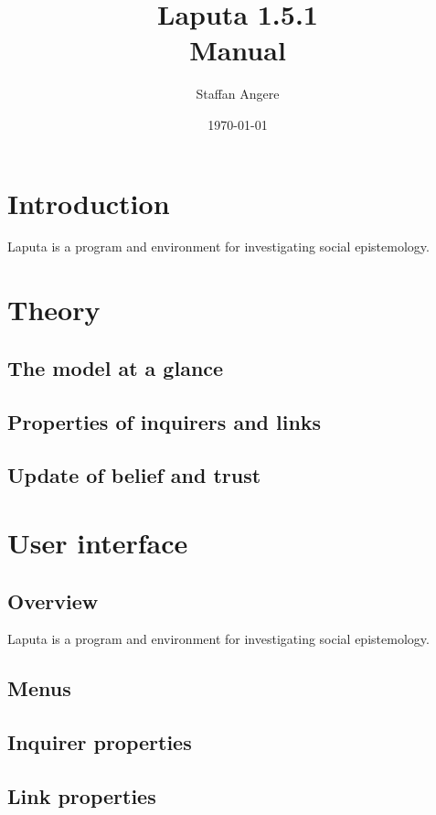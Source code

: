 \documentclass{report}
\begin{document}
\title{Laputa 1.5.1 \\ Manual}
\author{Staffan Angere}
\date{\today}
\maketitle

\chapter{Introduction}

Laputa is a program and environment for investigating social epistemology.

\chapter{Theory}

\section{The model at a glance}

\section{Properties of inquirers and links}

\section{Update of belief and trust}

\chapter{User interface}

\section{Overview}
Laputa is a program and environment for investigating social epistemology.

\section{Menus}

\section{Inquirer properties}

\section{Link properties}
\end{document}
